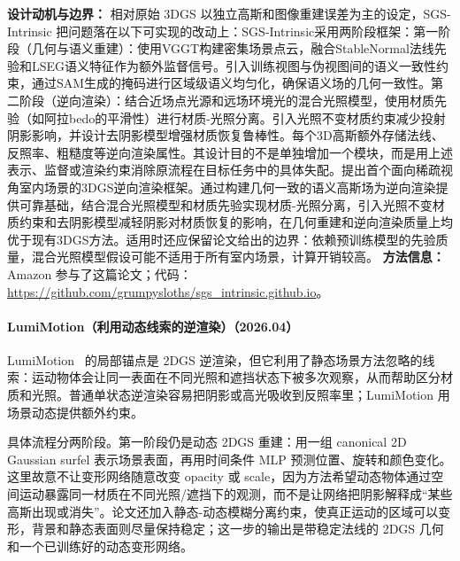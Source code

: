\textbf{设计动机与边界：} 相对原始 3DGS 以独立高斯和图像重建误差为主的设定，SGS-Intrinsic 把问题落在以下可实现的改动上：SGS-Intrinsic采用两阶段框架：第一阶段（几何与语义重建）：使用VGGT构建密集场景点云，融合StableNormal法线先验和LSEG语义特征作为额外监督信号。引入训练视图与伪视图间的语义一致性约束，通过SAM生成的掩码进行区域级语义均匀化，确保语义场的几何一致性。第二阶段（逆向渲染）：结合近场点光源和远场环境光的混合光照模型，使用材质先验（如阿拉bedo的平滑性）进行材质-光照分离。引入光照不变材质约束减少投射阴影影响，并设计去阴影模型增强材质恢复鲁棒性。每个3D高斯额外存储法线、反照率、粗糙度等逆向渲染属性。其设计目的不是单独增加一个模块，而是用上述表示、监督或渲染约束消除原流程在目标任务中的具体失配。提出首个面向稀疏视角室内场景的3DGS逆向渲染框架。通过构建几何一致的语义高斯场为逆向渲染提供可靠基础，结合混合光照模型和材质先验实现材质-光照分离，引入光照不变材质约束和去阴影模型减轻阴影对材质恢复的影响，在几何重建和逆向渲染质量上均优于现有3DGS方法。适用时还应保留论文给出的边界：依赖预训练模型的先验质量，混合光照模型假设可能不适用于所有室内场景，计算开销较高。
\textbf{方法信息：} Amazon 参与了这篇论文；代码：\url{https://github.com/grumpysloths/sgs_intrinsic.github.io}。



\paragraph{LumiMotion（利用动态线索的逆渲染）（2026.04）}
LumiMotion~\cite{2604_10994} 的局部锚点是 2DGS 逆渲染，但它利用了静态场景方法忽略的线索：运动物体会让同一表面在不同光照和遮挡状态下被多次观察，从而帮助区分材质和光照。普通单状态逆渲染容易把阴影或高光吸收到反照率里；LumiMotion 用场景动态提供额外约束。

具体流程分两阶段。第一阶段仍是动态 2DGS 重建：用一组 canonical 2D Gaussian surfel 表示场景表面，再用时间条件 MLP 预测位置、旋转和颜色变化。这里故意不让变形网络随意改变 opacity 或 scale，因为方法希望动态物体通过空间运动暴露同一材质在不同光照/遮挡下的观测，而不是让网络把阴影解释成“某些高斯出现或消失”。论文还加入静态-动态模糊分离约束，使真正运动的区域可以变形，背景和静态表面则尽量保持稳定；这一步的输出是带稳定法线的 2DGS 几何和一个已训练好的动态变形网络。

